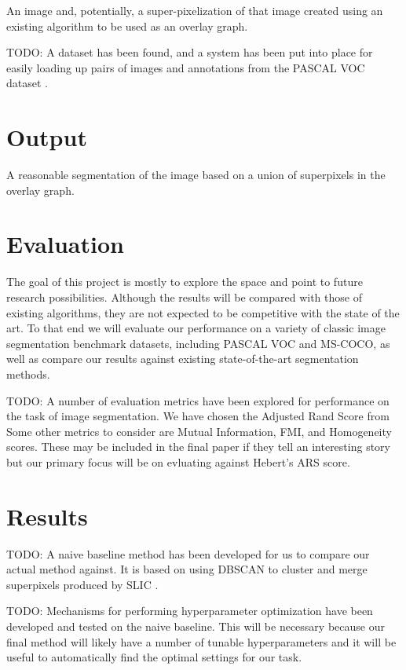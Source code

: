 \documentclass[twocolumn]{article}
\newcommand{\todo}[1]{}
\renewcommand{\todo}[1]{{\color{red} TODO: {#1}}}
\begin{document}
An image and, potentially, a super-pixelization of that image created using an existing algorithm to be used as an overlay
graph.

\todo{
A dataset has been found, and a system has been put into place for easily loading up pairs of images and annotations from the
PASCAL VOC dataset \cite{Everingham10}. 
}

\section{Output}

A reasonable segmentation of the image based on a union of superpixels in the overlay graph.

\section{Evaluation}

The goal of this project is mostly to explore the space and point to future research possibilities. Although the results will
be compared with those of existing algorithms, they are not expected to be competitive with the state of the art. To that end
we will evaluate our performance on a variety of classic image segmentation benchmark datasets, including PASCAL VOC and
MS-COCO, as well as compare our results against existing state-of-the-art segmentation methods. 

\todo{
A number of evaluation metrics have been explored for performance on the task of image segmentation. We have chosen the
Adjusted Rand Score from \cite{unnikrishnan2005measure}  Some other metrics to consider are Mutual Information, FMI, and
Homogeneity scores. These may be included in the final paper if they tell an interesting story but our primary focus will be
on evluating against Hebert's ARS score.
}

\section{Results}

\todo{
A naive baseline method has been developed for us to compare our actual method against. It is based on using DBSCAN
\cite{ester1996density} to cluster and merge superpixels produced by SLIC \cite{achanta2010slic}.
}

\todo{
Mechanisms for performing hyperparameter optimization have been developed and tested on the naive baseline. This will be
necessary because our final method will likely have a number of tunable hyperparameters and it will be useful to automatically
find the optimal settings for our task.
}


 
\end{document}
